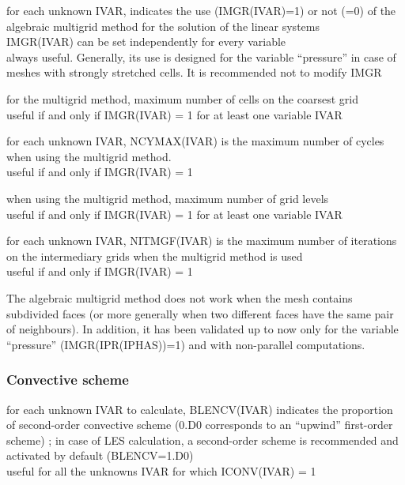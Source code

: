 {for each unknown IVAR, indicates the use (IMGR(IVAR)=1) or not (=0) of the 
algebraic multigrid method for the solution of the linear systems\\
IMGR(IVAR) can be set independently for every variable\\
always useful. Generally, its use is designed for the variable ``pressure'' in
case of meshes with strongly stretched cells. It is recommended not to modify
IMGR}

{for the multigrid method, maximum number of cells on the coarsest grid\\
useful if and only if IMGR(IVAR) = 1 for at least one variable IVAR}

{for each unknown IVAR, NCYMAX(IVAR) is the maximum number of cycles when using
the multigrid method.\\ 
useful if and only if IMGR(IVAR) = 1}

{when using the multigrid method, maximum number of grid levels\\
useful if and only if IMGR(IVAR) = 1 for at least one variable IVAR}

{for each unknown IVAR, NITMGF(IVAR) is the maximum number of iterations on the intermediary
grids when the multigrid method is used\\
useful if and only if IMGR(IVAR) = 1}

The algebraic multigrid method does not work when the mesh contains
subdivided faces (or more generally when two different faces have the
same pair of neighbours). In addition, it has been validated up to now only for
the variable ``pressure'' (IMGR(IPR(IPHAS))=1) and with non-parallel computations.

\subsubsection{Convective scheme}

{for each unknown IVAR to calculate, BLENCV(IVAR) indicates the proportion of 
second-order convective scheme (0.D0 corresponds to an
``upwind'' first-order scheme) ; in case of LES calculation, a
second-order scheme is recommended and activated by default (BLENCV=1.D0)\\
useful for all the unknowns IVAR for which ICONV(IVAR) = 1}

